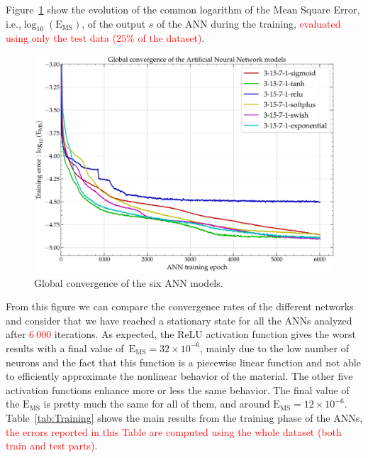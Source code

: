 \documentclass[algorithms,article,submit,pdftex,oneauthors]{Definitions/mdpi}
\makeatletter
\DeclareRobustCommand{\ie}{i.e.,\@\xspace}
\DeclareRobustCommand{\MSE}{\text{E}_\text{MS}}
\makeatother
\begin{document}
Figure~\ref{fig:ANN-conv} show the evolution of the common logarithm of the Mean Square Error, \ie $\log_{10}(\MSE)$, of the output $s$ of the ANN during the training, \textcolor{red}{evaluated using only the test data ($25\%$ of the dataset)}.
\begin{figure}[h!]
\centering
\includegraphics[width=0.7\columnwidth]{Figures/3Cr2Mo-convergence}
\caption{Global convergence of the six ANN models.}
\label{fig:ANN-conv}
\end{figure}
From this figure we can compare the convergence rates of the different networks and consider that we have reached a stationary state for all the ANNs analyzed after \textcolor{red}{$6~000$} iterations.
As expected, the ReLU activation function gives the worst results with a final value of~$\MSE=32\times10^{-6}$, mainly due to the low number of neurons and the fact that this function is a piecewise linear function and not able to efficiently approximate the nonlinear behavior of the material.
The other five activation functions enhance more or less the same behavior.
The final value of the $\MSE$ is pretty much the same for all of them, and around $\MSE=12\times10^{-6}$.
Table~\ref{tab:Training} shows the main results from the training phase of the ANNs, \textcolor{red}{the errors reported in this Table are computed using the whole dataset (both train and test parts)}.
\end{document}
